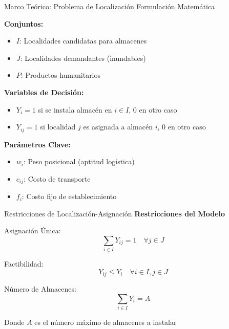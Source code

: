 \documentclass[
  ignorenonframetext,
]{beamer}
\providecommand{\tightlist}{%
  \setlength{\itemsep}{0pt}\setlength{\parskip}{0pt}}
\begin{document}
\begin{frame}{Marco Teórico: Problema de Localización}
\label{marco-teuxf3rico-problema-de-localizaciuxf3n}
Formulación Matemática

\textbf{Conjuntos:}

\begin{itemize}
\tightlist
\item
  \(I\): Localidades candidatas para almacenes
\item
  \(J\): Localidades demandantes (inundables)\\
\item
  \(P\): Productos humanitarios
\end{itemize}

\textbf{Variables de Decisión:}

\begin{itemize}
\tightlist
\item
  \(Y_i = 1\) si se instala almacén en \(i \in I\), \(0\) en otro caso
\item
  \(Y_{ij} = 1\) si localidad \(j\) es asignada a almacén \(i\), \(0\)
  en otro caso
\end{itemize}

\textbf{Parámetros Clave:}

\begin{itemize}
\tightlist
\item
  \(w_i\): Peso posicional (aptitud logística)
\item
  \(c_{ij}\): Costo de transporte
\item
  \(f_i\): Costo fijo de establecimiento
\end{itemize}
\end{frame}

\begin{frame}{Restricciones de Localización-Asignación}
\label{restricciones-de-localizaciuxf3n-asignaciuxf3n}
\textbf{Restricciones del Modelo}

Asignación Única: \[\sum_{i \in I} Y_{ij} = 1 \quad \forall j \in J\]

Factibilidad: \[Y_{ij} \leq Y_i \quad \forall i \in I, j \in J\]

Número de Almacenes: \[\sum_{i \in I} Y_i = A\]

Donde \(A\) es el número máximo de almacenes a instalar
\end{frame}
\end{document}
